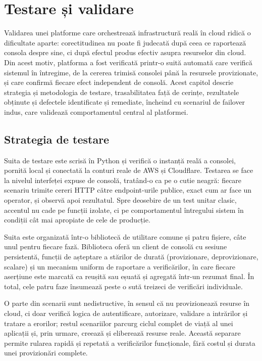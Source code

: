 \documentclass[12pt,a4paper]{report}
\begin{document}
\chapter{Testare și validare}

Validarea unei platforme care orchestrează infrastructură reală în cloud ridică o dificultate aparte: corectitudinea nu poate fi judecată după ceea ce raportează consola despre sine, ci după efectul produs efectiv asupra resurselor din cloud. Din acest motiv, platforma a fost verificată printr-o suită automată care verifică sistemul în întregime, de la cererea trimisă consolei până la resursele provizionate, și care confirmă fiecare efect independent de consolă. Acest capitol descrie strategia și metodologia de testare, trasabilitatea față de cerințe, rezultatele obținute și defectele identificate și remediate, încheind cu scenariul de failover indus, care validează comportamentul central al platformei.

\section{Strategia de testare}
Suita de testare este scrisă în Python și verifică o instanță reală a consolei, pornită local și conectată la conturi reale de AWS și Cloudflare. Testarea se face la nivelul interfeței expuse de consolă, tratând-o ca pe o cutie neagră: fiecare scenariu trimite cereri HTTP către endpoint-urile publice, exact cum ar face un operator, și observă apoi rezultatul. Spre deosebire de un test unitar clasic, accentul nu cade pe funcții izolate, ci pe comportamentul întregului sistem în condiții cât mai apropiate de cele de producție.

Suita este organizată într-o bibliotecă de utilitare comune și patru fișiere, câte unul pentru fiecare fază. Biblioteca oferă un client de consolă cu sesiune persistentă, funcții de așteptare a stărilor de durată (provizionare, deprovizionare, scalare) și un mecanism uniform de raportare a verificărilor, în care fiecare aserțiune este marcată ca reușită sau eșuată și agregată într-un rezumat final. În total, cele patru faze însumează peste o sută treizeci de verificări individuale.

O parte din scenarii sunt nedistructive, în sensul că nu provizionează resurse în cloud, ci doar verifică logica de autentificare, autorizare, validare a intrărilor și tratare a erorilor; restul scenariilor parcurg ciclul complet de viață al unei aplicații și, prin urmare, creează și eliberează resurse reale. Această separare permite rularea rapidă și repetată a verificărilor funcționale, fără costul și durata unei provizionări complete.
\end{document}
